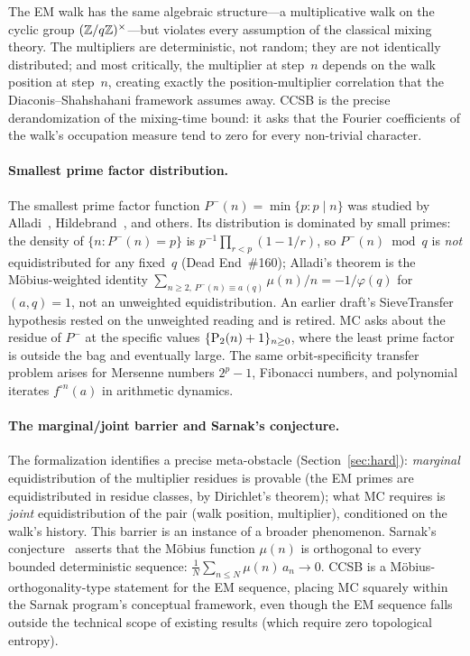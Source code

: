 The EM walk has the same algebraic structure---a multiplicative walk
on the cyclic group $(\mathbb{Z}/q\mathbb{Z})^\times$---but violates every
assumption of the classical mixing theory.  The multipliers are
deterministic, not random; they are not identically distributed; and
most critically, the multiplier at step~$n$ depends on the walk
position at step~$n$, creating exactly the position-multiplier
correlation that the Diaconis--Shahshahani framework assumes away.
CCSB is the precise derandomization of the mixing-time bound: it asks
that the Fourier coefficients of the walk's occupation measure tend to
zero for every non-trivial character.

\paragraph{Smallest prime factor distribution.}
The smallest prime factor function
$P^-(n) = \min\{p : p \mid n\}$ was studied by Alladi~\cite{Alladi1977},
Hildebrand~\cite{Hildebrand1986}, and others.  Its distribution is
dominated by small primes: the density of $\{n : P^-(n) = p\}$ is
$p^{-1}\prod_{r<p}(1-1/r)$, so $P^-(n) \bmod q$ is \emph{not}
equidistributed for any fixed~$q$ (Dead End~\#160); Alladi's theorem
is the M\"obius-weighted identity
$\sum_{n \ge 2,\, P^-(n) \equiv a \,(q)} \mu(n)/n = -1/\varphi(q)$
for $(a,q)=1$, not an
unweighted equidistribution.  An earlier draft's SieveTransfer
hypothesis rested on the unweighted reading and is retired.
MC asks about the residue of $P^-$ at the specific values
$\{\mathrm{P}_{2}(n)+1\}_{n \geq 0}$, where the least prime factor is
outside the bag and eventually large.
The same orbit-specificity transfer problem arises for Mersenne
numbers $2^p - 1$, Fibonacci numbers, and polynomial iterates
$f^{\circ n}(a)$ in arithmetic dynamics.

\paragraph{The marginal/joint barrier and Sarnak's conjecture.}
The formalization identifies a precise meta-obstacle
(Section~\ref{sec:hard}): \emph{marginal} equidistribution of the
multiplier residues is provable (the EM primes are equidistributed in
residue classes, by Dirichlet's theorem); what MC requires is
\emph{joint} equidistribution of the pair (walk position, multiplier),
conditioned on the walk's history.  This barrier is an instance of a
broader phenomenon.  Sarnak's conjecture~\cite{Sarnak2010} asserts that the
M\"obius function $\mu(n)$ is orthogonal to every bounded
deterministic sequence:
$\frac{1}{N} \sum_{n \leq N} \mu(n) \, a_n \to 0$.
CCSB is a M\"obius-orthogonality-type statement for the EM sequence,
placing MC squarely within the Sarnak program's conceptual framework,
even though the EM sequence falls outside the technical scope of
existing results (which require zero topological entropy).

